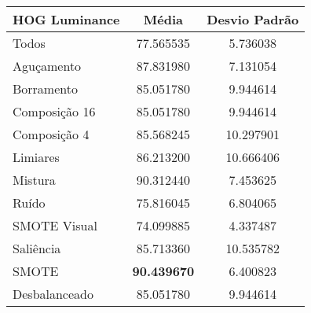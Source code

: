 \begin{table}[!htbp]
\centering
\caption{}
\label{tab:resultados:x:melhor}
\begin{tabular}{|l|c|c|}
\hline
\textbf{HOG Luminance} & \textbf{Média}     & \textbf{Desvio Padrão} \\ \hline
   Todos        &  77.565535  &  5.736038  \\ \hline
  Aguçamento    &  87.831980  &  7.131054  \\ \hline
  Borramento    &  85.051780  &  9.944614  \\ \hline
  Composição 16 &  85.051780  &  9.944614  \\ \hline
  Composição 4  &  85.568245 &  10.297901  \\ \hline
  Limiares      &  86.213200 &  10.666406  \\ \hline
  Mistura       &  90.312440  &  7.453625  \\ \hline
  Ruído         &  75.816045  &  6.804065  \\ \hline
  SMOTE Visual  &  74.099885  &  4.337487  \\ \hline
  Saliência     &  85.713360 &  10.535782  \\ \hline
 SMOTE          &  \textbf{90.439670}  &  6.400823  \\ \hline
Desbalanceado   &  85.051780  &  9.944614  \\ \hline
\end{tabular}
\end{table}



